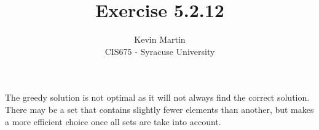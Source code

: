 \documentclass{article}
\author{Kevin Martin\\ CIS675 - Syracuse University}
\title{Exercise 5.2.12}
\begin{document}
\maketitle
The greedy solution is not optimal as it will not always find the
correct solution. There may be a set that contains slightly fewer
elements than another, but makes a more efficient choice once
all sets are take into account.
\end{document}
